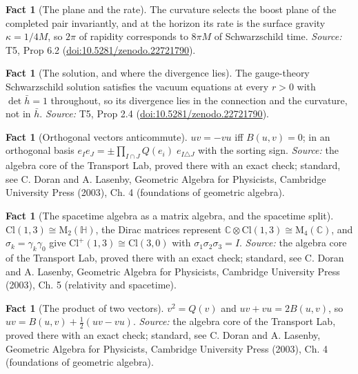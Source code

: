 \documentclass[11pt]{article}
\theoremstyle{definition}
\newtheorem{fact}[theorem]{Fact}
\theoremstyle{plain}
\providecommand{\C}{}\renewcommand{\C}{\mathbb{C}}
\providecommand{\Cl}{}\renewcommand{\Cl}{\mathrm{Cl}}
\providecommand{\HH}{}\renewcommand{\HH}{\mathbb{H}}
\providecommand{\Mat}{}\renewcommand{\Mat}{\mathrm{M}}
\providecommand{\hb}{}\renewcommand{\hb}{\bar{h}}
\begin{document}
\begin{fact}[The plane and the rate]\label{c:singularity.plane-rate}
The curvature selects the boost plane of the completed pair invariantly, and at the horizon its rate is the surface gravity $\kappa = 1/4M$, so $2\pi$ of rapidity corresponds to $8\pi M$ of Schwarzschild time.
\emph{Source:} T5, Prop 6.2 (\href{https://doi.org/10.5281/zenodo.22721790}{doi:10.5281/zenodo.22721790}).
\end{fact}

\begin{fact}[The solution, and where the divergence lies]\label{c:singularity.solution-where-divergence-lies}
The gauge-theory Schwarzschild solution satisfies the vacuum equations at every $r > 0$ with $\det \hb = 1$ throughout, so its divergence lies in the connection and the curvature, not in $\hb$.
\emph{Source:} T5, Prop 2.4 (\href{https://doi.org/10.5281/zenodo.22721790}{doi:10.5281/zenodo.22721790}).
\end{fact}

\begin{fact}[Orthogonal vectors anticommute]\label{c:std-algebra.orthogonal-anticommute}
$uv = -vu$ iff $B(u,v) = 0$; in an orthogonal basis $e_I e_J = \pm \prod_{I \cap J} Q(e_i)\; e_{I \triangle J}$ with the sorting sign.
\emph{Source:} the algebra core of the Transport Lab, proved there with an exact check; standard, see C. Doran and A. Lasenby, Geometric Algebra for Physicists, Cambridge University Press (2003), Ch. 4 (foundations of geometric algebra).
\end{fact}

\begin{fact}[The spacetime algebra as a matrix algebra, and the spacetime split]\label{c:std-algebra.sta-matrix}
$\Cl(1,3) \cong \Mat_2(\HH)$, the Dirac matrices represent $\C \otimes \Cl(1,3) \cong \Mat_4(\C)$, and $\sigma_k = \gamma_k\gamma_0$ give $\Cl^{+}(1,3) \cong \Cl(3,0)$ with $\sigma_1\sigma_2\sigma_3 = I$.
\emph{Source:} the algebra core of the Transport Lab, proved there with an exact check; standard, see C. Doran and A. Lasenby, Geometric Algebra for Physicists, Cambridge University Press (2003), Ch. 5 (relativity and spacetime).
\end{fact}

\begin{fact}[The product of two vectors]\label{c:std-algebra.vector-squares}
$v^{2} = Q(v)$ and $uv + vu = 2B(u, v)$, so $uv = B(u, v) + \tfrac12(uv - vu)$.
\emph{Source:} the algebra core of the Transport Lab, proved there with an exact check; standard, see C. Doran and A. Lasenby, Geometric Algebra for Physicists, Cambridge University Press (2003), Ch. 4 (foundations of geometric algebra).
\end{fact}
\end{document}
